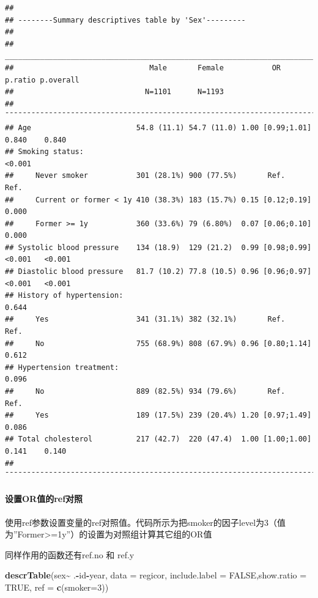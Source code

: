 \documentclass[
]{article}
\newenvironment{Shaded}{\begin{snugshade}}{\end{snugshade}}
\newcommand{\AttributeTok}[1]{\textcolor[rgb]{0.13,0.29,0.53}{#1}}
\newcommand{\ConstantTok}[1]{\textcolor[rgb]{0.56,0.35,0.01}{#1}}
\newcommand{\DecValTok}[1]{\textcolor[rgb]{0.00,0.00,0.81}{#1}}
\newcommand{\FunctionTok}[1]{\textcolor[rgb]{0.13,0.29,0.53}{\textbf{#1}}}
\newcommand{\NormalTok}[1]{#1}
\newcommand{\SpecialCharTok}[1]{\textcolor[rgb]{0.81,0.36,0.00}{\textbf{#1}}}
\newcommand{\StringTok}[1]{\textcolor[rgb]{0.31,0.60,0.02}{#1}}
\begin{document}
\begin{verbatim}
## 
## --------Summary descriptives table by 'Sex'---------
## 
## _____________________________________________________________________________________ 
##                               Male       Female           OR        p.ratio p.overall 
##                              N=1101      N=1193                                       
## ¯¯¯¯¯¯¯¯¯¯¯¯¯¯¯¯¯¯¯¯¯¯¯¯¯¯¯¯¯¯¯¯¯¯¯¯¯¯¯¯¯¯¯¯¯¯¯¯¯¯¯¯¯¯¯¯¯¯¯¯¯¯¯¯¯¯¯¯¯¯¯¯¯¯¯¯¯¯¯¯¯¯¯¯¯ 
## Age                        54.8 (11.1) 54.7 (11.0) 1.00 [0.99;1.01]  0.840    0.840   
## Smoking status:                                                              <0.001   
##     Never smoker           301 (28.1%) 900 (77.5%)       Ref.        Ref.             
##     Current or former < 1y 410 (38.3%) 183 (15.7%) 0.15 [0.12;0.19]  0.000            
##     Former >= 1y           360 (33.6%) 79 (6.80%)  0.07 [0.06;0.10]  0.000            
## Systolic blood pressure    134 (18.9)  129 (21.2)  0.99 [0.98;0.99] <0.001   <0.001   
## Diastolic blood pressure   81.7 (10.2) 77.8 (10.5) 0.96 [0.96;0.97] <0.001   <0.001   
## History of hypertension:                                                      0.644   
##     Yes                    341 (31.1%) 382 (32.1%)       Ref.        Ref.             
##     No                     755 (68.9%) 808 (67.9%) 0.96 [0.80;1.14]  0.612            
## Hypertension treatment:                                                       0.096   
##     No                     889 (82.5%) 934 (79.6%)       Ref.        Ref.             
##     Yes                    189 (17.5%) 239 (20.4%) 1.20 [0.97;1.49]  0.086            
## Total cholesterol          217 (42.7)  220 (47.4)  1.00 [1.00;1.00]  0.141    0.140   
## ¯¯¯¯¯¯¯¯¯¯¯¯¯¯¯¯¯¯¯¯¯¯¯¯¯¯¯¯¯¯¯¯¯¯¯¯¯¯¯¯¯¯¯¯¯¯¯¯¯¯¯¯¯¯¯¯¯¯¯¯¯¯¯¯¯¯¯¯¯¯¯¯¯¯¯¯¯¯¯¯¯¯¯¯¯
\end{verbatim}

\paragraph{\texorpdfstring{\textbf{设置OR值的ref对照}}{设置OR值的ref对照}}\label{ux8bbeux7f6eorux503cux7684refux5bf9ux7167}

使用ref参数设置变量的ref对照值。代码所示为把smoker的因子level为3（值为''Former\textgreater=1y''）的设置为对照组计算其它组的OR值

同样作用的函数还有ref.no 和 ref.y

\begin{Shaded}
\begin{Highlighting}[]
\FunctionTok{descrTable}\NormalTok{(}\StringTok{\textasciigrave{}}\AttributeTok{sex}\StringTok{\textasciigrave{}}\SpecialCharTok{\textasciitilde{}}\NormalTok{ .}\SpecialCharTok{{-}}\NormalTok{id}\SpecialCharTok{{-}}\NormalTok{year, }\AttributeTok{data =}\NormalTok{ regicor,}
           \AttributeTok{include.label =} \ConstantTok{FALSE}\NormalTok{,}\AttributeTok{show.ratio =} \ConstantTok{TRUE}\NormalTok{,}
           \AttributeTok{ref =} \FunctionTok{c}\NormalTok{(}\AttributeTok{smoker=}\DecValTok{3}\NormalTok{))}
\end{Highlighting}
\end{Shaded}
\end{document}
